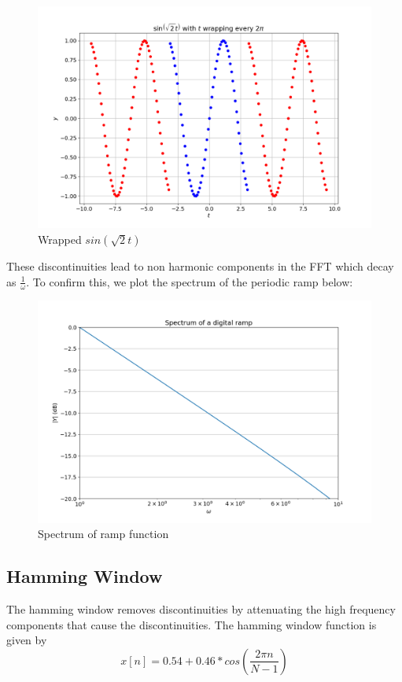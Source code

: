 \documentclass{article}
\begin{document}
\begin{figure}[!tbh]
\centering
\includegraphics[scale=0.4]{plots/wrapped_sin.png}
\caption{Wrapped $sin(\sqrt{2}t)$}
\label{fig:3}
\end{figure}

These discontinuities lead to  non harmonic components in the FFT which decay as \(\frac{1}{\omega}\). To confirm
this, we plot the spectrum of the periodic ramp below:
\begin{figure}[!tbh]
\centering
\includegraphics[scale=0.4]{plots/ramp.png}
\caption{Spectrum of ramp function}
\label{fig:4}
\end{figure}

\subsection{Hamming Window}
The hamming window removes discontinuities by attenuating the high frequency components that cause the discontinuities.
The hamming window function is given by
\begin{equation}
    x[n] = 0.54 + 0.46*cos(\frac{2\pi n}{N-1})
\end{equation}
\end{document}
